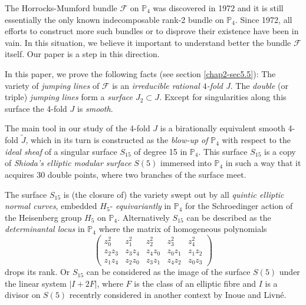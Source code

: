 The Horrocks-Mumford bundle $\mathscr{F}$ on $\mathbb{P}_{4}$ was
discovered in 1972 and it is still essentially the only known
indecomposable rank-2 bundle on $\mathbb{P}_{4}$. Since 1972, all
efforts to construct more such bundles or to disprove their existence
have been in vain. In this situation, we believe it important to
understand better the bundle $\mathscr{F}$ itself. Our paper is a step
in this direction.

In this paper, we prove the following facts (see
section \ref{chap2-sec5.5}): The variety of {\em jumping lines} of
$\mathscr{F}$ is an {\em irreducible rational $4$-fold J.} The {\em
double} (or triple) {\em jumping lines} form a {\em surface
$J_{2}\subset J$.} Except for singularities along this surface the
4-fold $J$ is {\em smooth}.

The main tool in our study of the 4-fold $J$ is a birationally
equivalent smooth 4-fold $\widetilde{J}$, which in its turn is
constructed as the {\em blow-up of} $\mathbb{P}_{4}$ with respect to
the {\em ideal sheaf} of a singular surface $S_{15}$ of degree 15 in
$\mathbb{P}_{4}$. This surface $S_{15}$ is a copy of {\em Shioda's
elliptic modular surface} $S(5)$ immersed into $\mathbb{P}_{4}$ in
such a way that it acquires 30 double points, where two branches of
the surface meet.

The surface $S_{15}$ is (the closure of) the variety swept out by all
{\em quintic elliptic normal curves}, embedded $H_{5}$-{\em
equivariantly} in $\mathbb{P}_{4}$ for the Schroedinger action of the
Heisenberg group $H_{5}$ on $\mathbb{P}_{4}$. Alternatively $S_{15}$
can be described as the {\em determinantal locus} in $\mathbb{P}_{4}$
where the matrix of homogeneous polynomials
$$
\begin{pmatrix}
z^{2}_{0} & z^{2}_{1} & z^{2}_{2} & z^{2}_{3} & z^{2}_{4}\\[3pt]
z_{2}z_{3} & z_{3}z_{4} & z_{4}z_0 & z_{0}z_{1} & z_{1}z_{2}\\[3pt]
z_{1}z_{4} & z_{2}z_{0} & z_{3}z_{1} & z_{4}z_{2} & z_{0}z_{3}
\end{pmatrix}
$$\pageoriginale
drops its rank. Or $S_{15}$ can be considered as the image of the
surface $S(5)$ under the linear system $|I+2F|$, where $F$ is the
class of an elliptic fibre and $I$ is a divisor on $S(5)$ recentrly
considered in another context by Inoue and Livn\'e.

